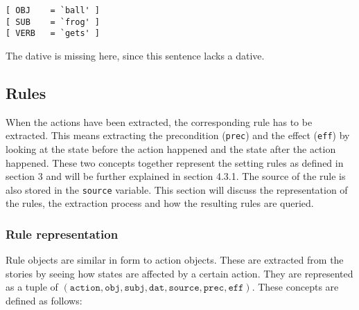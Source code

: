 \begin{verbatim}
[ OBJ    = `ball' ]
[ SUB    = `frog' ]
[ VERB   = `gets' ]
\end{verbatim}

The dative is missing here, since this sentence lacks a dative.

\subsection{Rules}

When the actions have been extracted, the corresponding rule has to be
extracted. This means extracting the precondition (\texttt{prec}) and the effect
(\texttt{eff}) by looking at the state before the action happened and the state
after the action happened. These two concepts together represent the setting
rules as defined in section 3 and will be further explained in section 4.3.1. The source of the rule
is also stored in the \texttt{source} variable. This section will discuss the representation of the
rules, the extraction process and how the resulting rules are queried.

\subsubsection{Rule representation}

Rule objects are similar in form to action objects. These are extracted from 
the stories by seeing how states are affected by a certain action.
They are represented as a tuple of $(\texttt{action}, \texttt{obj}, \texttt{subj}, \texttt{dat}, \texttt{source},
\texttt{prec}, \texttt{eff})$. These concepts are defined as
follows:

